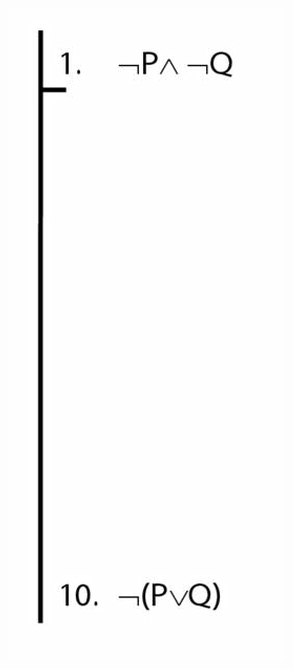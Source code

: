 \documentclass[12pt]{extarticle}
\begin{document}
\begin{multicols*}{3}
\begin{center}
\includegraphics[scale=0.3]{img/unit_821_proof2.png}
\end{center}
 


%
 

 


\end{multicols*}
\end{document}
